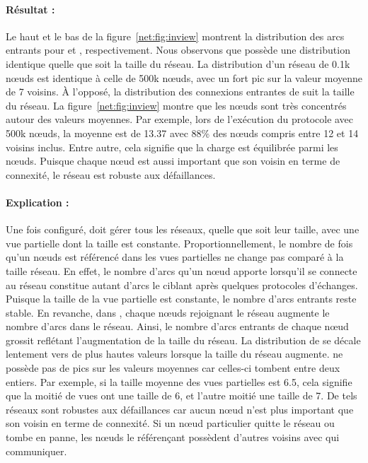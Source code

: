 \paragraph{Résultat :} Le haut et le bas de la figure~\ref{net:fig:inview}
montrent la distribution des arcs entrants pour \CYCLON et \SPRAY,
respectivement. Nous observons que \CYCLON possède une distribution identique
quelle que soit la taille du réseau. La distribution d'un réseau de 0.1k nœuds
est identique à celle de 500k nœuds, avec un fort pic sur la valeur moyenne de 7
voisins. À l'opposé, la distribution des connexions entrantes de \SPRAY suit la
taille du réseau. La figure~\ref{net:fig:inview} montre que les nœuds sont très
concentrés autour des valeurs moyennes. Par exemple, lors de l'exécution du
protocole \SPRAY avec 500k nœuds, la moyenne est de 13.37 avec 88\% des nœuds
compris entre 12 et 14 voisins inclus. Entre autre, cela signifie que la charge
est équilibrée parmi les nœuds. Puisque chaque nœud est aussi important que son
voisin en terme de connexité, le réseau est robuste aux défaillances.

\paragraph{Explication :} Une fois configuré, \CYCLON doit gérer tous les
réseaux, quelle que soit leur taille, avec une vue partielle dont la taille est
constante. Proportionnellement, le nombre de fois qu'un nœuds est référencé dans
les vues partielles ne change pas comparé à la taille réseau. En effet, le
nombre d'arcs qu'un nœud apporte lorsqu'il se connecte au réseau constitue
autant d'arcs le ciblant après quelques protocoles d'échanges. Puisque la taille
de la vue partielle est constante, le nombre d'arcs entrants reste stable. En
revanche, dans \SPRAY, chaque nœuds rejoignant le réseau augmente le nombre
d'arcs dans le réseau. Ainsi, le nombre d'arcs entrants de chaque nœud grossit
reflétant l'augmentation de la taille du réseau. La distribution de \SPRAY se
décale lentement vers de plus hautes valeurs lorsque la taille du réseau
augmente. \SPRAY ne possède pas de pics sur les valeurs moyennes car celles-ci
tombent entre deux entiers. Par exemple, si la taille moyenne des vues
partielles est 6.5, cela signifie que la moitié de vues ont une taille de 6, et
l'autre moitié une taille de 7. De tels réseaux sont robustes aux défaillances
car aucun nœud n'est plus important que son voisin en terme de connexité. Si un
nœud particulier quitte le réseau ou tombe en panne, les nœuds le référençant
possèdent d'autres voisins avec qui communiquer.

